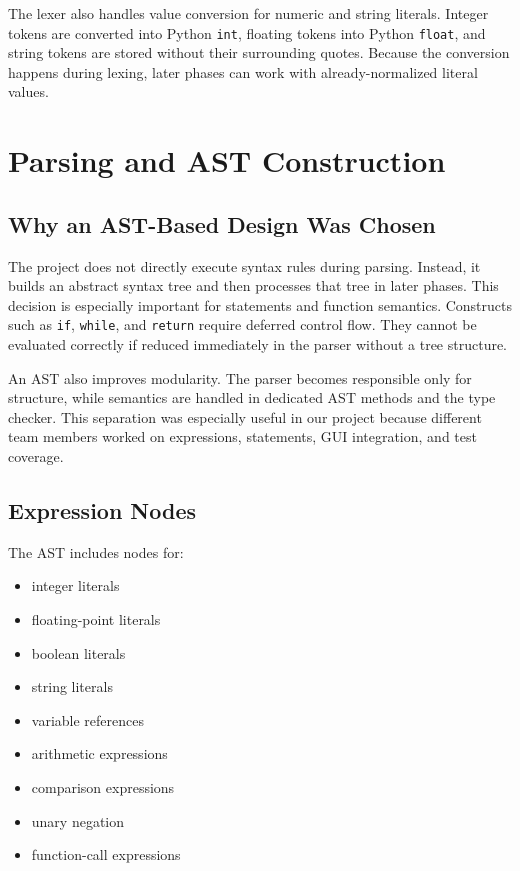 \documentclass[12pt,a4paper]{article}
\begin{document}
The lexer also handles value conversion for numeric and string literals. Integer tokens are converted into Python \texttt{int}, floating tokens into Python \texttt{float}, and string tokens are stored without their surrounding quotes. Because the conversion happens during lexing, later phases can work with already-normalized literal values.

\section{Parsing and AST Construction}
\subsection{Why an AST-Based Design Was Chosen}
The project does not directly execute syntax rules during parsing. Instead, it builds an abstract syntax tree and then processes that tree in later phases. This decision is especially important for statements and function semantics. Constructs such as \texttt{if}, \texttt{while}, and \texttt{return} require deferred control flow. They cannot be evaluated correctly if reduced immediately in the parser without a tree structure.

An AST also improves modularity. The parser becomes responsible only for structure, while semantics are handled in dedicated AST methods and the type checker. This separation was especially useful in our project because different team members worked on expressions, statements, GUI integration, and test coverage.

\subsection{Expression Nodes}
The AST includes nodes for:

\begin{itemize}[leftmargin=1.0cm]
    \item integer literals
    \item floating-point literals
    \item boolean literals
    \item string literals
    \item variable references
    \item arithmetic expressions
    \item comparison expressions
    \item unary negation
    \item function-call expressions
\end{itemize}
\end{document}
